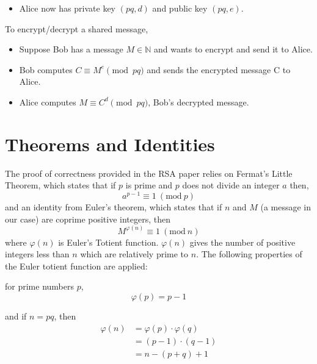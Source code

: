 \documentclass[12pt]{article}
\newcommand{\Mod}[1]{\ (\text{mod}\ #1)}
\begin{document}
\begin{multicols}{2}
\begin{itemize}
\item Alice now has private key $(pq,d)$ and public key $(pq,e)$.
\end{itemize}

To encrypt/decrypt a shared message,

\renewcommand\labelitemi{\tiny$\bullet$}
\begin{itemize}

\item Suppose Bob has a message $M \in \mathbb{N}$ and wants to encrypt and send it to Alice. 

\item Bob computes $ C \equiv M ^ e \pmod{pq}$ and sends the encrypted message C to Alice.

\item Alice computes $M \equiv C^d \pmod{pq}$, Bob's decrypted message.

\end{itemize}

\maketitle
\section*{Theorems and Identities}

The proof of correctness provided in the RSA paper relies on Fermat's Little Theorem, which states that if $p$ is prime and $p$ does not divide an integer $a$ then, $$ a^{p-1} \equiv 1 \Mod{p}$$
and an identity from Euler's theorem, which states that if $n$ and $M$ (a message in our case) are coprime positive integers, then 
\begin{equation} \label{eq:1}
M ^{\varphi(n)} \equiv 1 \Mod{n}  
\end{equation}
where $\varphi(n)$ is Euler's Totient function. $\varphi(n)$ gives the number of positive integers less than $n$ which are relatively prime to $n$. 
The following properties of the Euler totient function are applied: 

for prime numbers $p$,
$$\varphi(p) = p-1 $$ 

and if $n = pq$, then 
\begin{align} 
\varphi(n) &= \varphi(p) \cdot \varphi(q) \nonumber\\
&= (p-1)\cdot(q-1) \\ \label{eq2}
&= n - (p+q) +1 \nonumber
\end{align}


\end{multicols}
\end{document}
